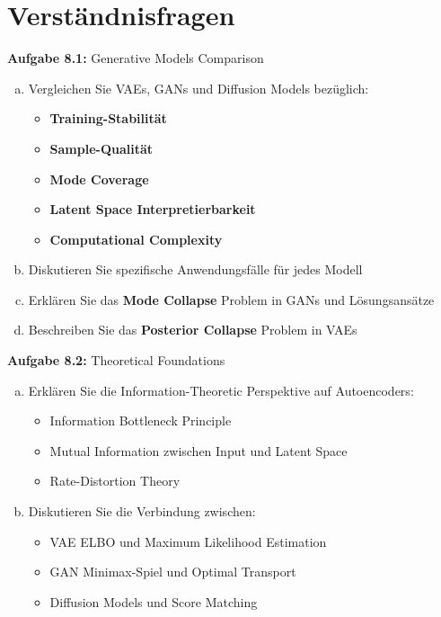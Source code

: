 \documentclass[12pt,a4paper]{article}
\begin{document}
\section{Verständnisfragen}

\textbf{Aufgabe 8.1:} Generative Models Comparison

\begin{enumerate}[(a)]
    \item Vergleichen Sie VAEs, GANs und Diffusion Models bezüglich:
    \begin{itemize}
        \item \textbf{Training-Stabilität}
        \item \textbf{Sample-Qualität}
        \item \textbf{Mode Coverage}
        \item \textbf{Latent Space Interpretierbarkeit}
        \item \textbf{Computational Complexity}
    \end{itemize}
    \item Diskutieren Sie spezifische Anwendungsfälle für jedes Modell
    \item Erklären Sie das \textbf{Mode Collapse} Problem in GANs und Lösungsansätze
    \item Beschreiben Sie das \textbf{Posterior Collapse} Problem in VAEs
\end{enumerate}

\textbf{Aufgabe 8.2:} Theoretical Foundations

\begin{enumerate}[(a)]
    \item Erklären Sie die Information-Theoretic Perspektive auf Autoencoders:
    \begin{itemize}
        \item Information Bottleneck Principle
        \item Mutual Information zwischen Input und Latent Space
        \item Rate-Distortion Theory
    \end{itemize}
    \item Diskutieren Sie die Verbindung zwischen:
    \begin{itemize}
        \item VAE ELBO und Maximum Likelihood Estimation
        \item GAN Minimax-Spiel und Optimal Transport
        \item Diffusion Models und Score Matching
    \end{itemize}
\end{enumerate}
\end{document}
